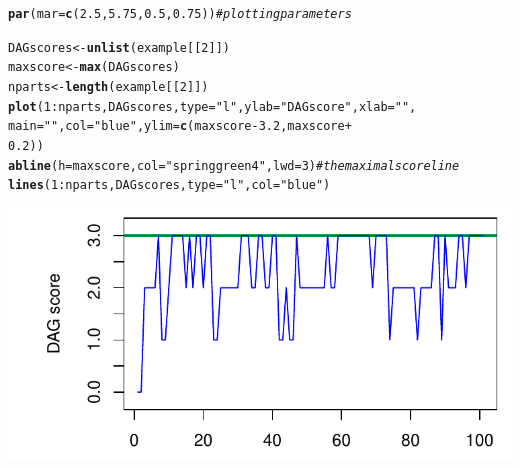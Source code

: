 \documentclass[a4paper]{article}\usepackage[]{graphicx}\usepackage[]{color}
\makeatletter
\def\maxwidth{ %
  \ifdim\Gin@nat@width>\linewidth
    \linewidth
  \else
    \Gin@nat@width
  \fi
}
\newcommand{\hlnum}[1]{\textcolor[rgb]{0.686,0.059,0.569}{#1}}%
\newcommand{\hlstr}[1]{\textcolor[rgb]{0.192,0.494,0.8}{#1}}%
\newcommand{\hlcom}[1]{\textcolor[rgb]{0.678,0.584,0.686}{\textit{#1}}}%
\newcommand{\hlopt}[1]{\textcolor[rgb]{0,0,0}{#1}}%
\newcommand{\hlstd}[1]{\textcolor[rgb]{0.345,0.345,0.345}{#1}}%
\newcommand{\hlkwb}[1]{\textcolor[rgb]{0.69,0.353,0.396}{#1}}%
\newcommand{\hlkwc}[1]{\textcolor[rgb]{0.333,0.667,0.333}{#1}}%
\newcommand{\hlkwd}[1]{\textcolor[rgb]{0.737,0.353,0.396}{\textbf{#1}}}%
\newenvironment{kframe}{%
 \def\at@end@of@kframe{}%
 \ifinner\ifhmode%
  \def\at@end@of@kframe{\end{minipage}}%
  \begin{minipage}{\columnwidth}%
 \fi\fi%
 \def\FrameCommand##1{\hskip\@totalleftmargin \hskip-\fboxsep
 \colorbox{shadecolor}{##1}\hskip-\fboxsep
     \hskip-\linewidth \hskip-\@totalleftmargin \hskip\columnwidth}%
 \MakeFramed {\advance\hsize-\width
   \@totalleftmargin\z@ \linewidth\hsize
   \@setminipage}}%
 {\par\unskip\endMakeFramed%
 \at@end@of@kframe}
\newenvironment{knitrout}{}{} %
\makeatother
\begin{document}
\begin{knitrout}
\color{fgcolor}\begin{kframe}
\begin{alltt}
\hlkwd{par}\hlstd{(}\hlkwc{mar} \hlstd{=} \hlkwd{c}\hlstd{(}\hlnum{2.5}\hlstd{,} \hlnum{5.75}\hlstd{,} \hlnum{0.5}\hlstd{,} \hlnum{0.75}\hlstd{))}  \hlcom{# plotting parameters}

\hlstd{DAGscores} \hlkwb{<-} \hlkwd{unlist}\hlstd{(example[[}\hlnum{2}\hlstd{]])}
\hlstd{maxscore} \hlkwb{<-} \hlkwd{max}\hlstd{(DAGscores)}
\hlstd{nparts} \hlkwb{<-} \hlkwd{length}\hlstd{(example[[}\hlnum{2}\hlstd{]])}
\hlkwd{plot}\hlstd{(}\hlnum{1}\hlopt{:}\hlstd{nparts, DAGscores,} \hlkwc{type} \hlstd{=} \hlstr{"l"}\hlstd{,} \hlkwc{ylab} \hlstd{=} \hlstr{"DAG score"}\hlstd{,} \hlkwc{xlab} \hlstd{=} \hlstr{""}\hlstd{,}
    \hlkwc{main} \hlstd{=} \hlstr{""}\hlstd{,} \hlkwc{col} \hlstd{=} \hlstr{"blue"}\hlstd{,} \hlkwc{ylim} \hlstd{=} \hlkwd{c}\hlstd{(maxscore} \hlopt{-} \hlnum{3.2}\hlstd{, maxscore} \hlopt{+}
        \hlnum{0.2}\hlstd{))}
\hlkwd{abline}\hlstd{(}\hlkwc{h} \hlstd{= maxscore,} \hlkwc{col} \hlstd{=} \hlstr{"springgreen4"}\hlstd{,} \hlkwc{lwd} \hlstd{=} \hlnum{3}\hlstd{)}  \hlcom{# the maximal score line}
\hlkwd{lines}\hlstd{(}\hlnum{1}\hlopt{:}\hlstd{nparts, DAGscores,} \hlkwc{type} \hlstd{=} \hlstr{"l"}\hlstd{,} \hlkwc{col} \hlstd{=} \hlstr{"blue"}\hlstd{)}
\end{alltt}
\end{kframe}

{\centering \includegraphics[width=\maxwidth]{figure/minimal-unnamed-chunk-23-1} 

}



\end{knitrout}
\end{document}
